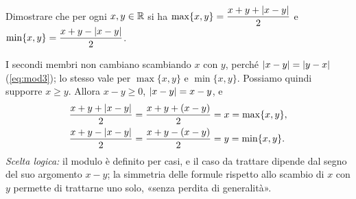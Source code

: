 \begin{esercizio}
Dimostrare che per ogni $x,y\in\mathbb{R}$ si ha $\max\{x,y\}=\dfrac{x+y+\lvert x-y\rvert}{2}$ e
$\min\{x,y\}=\dfrac{x+y-\lvert x-y\rvert}{2}$.
\begin{soluzione}
I secondi membri non cambiano scambiando $x$ con $y$, perché $\lvert x-y\rvert=\lvert y-x\rvert$
(\eqref{eq:mod3}); lo stesso vale per $\max\{x,y\}$ e $\min\{x,y\}$. Possiamo quindi
supporre $x\ge y$. Allora $x-y\ge0$, $\lvert x-y\rvert=x-y$, e
\[
\begin{aligned}
  \frac{x+y+\lvert x-y\rvert}{2}&=\frac{x+y+(x-y)}{2}=x=\max\{x,y\},\\
  \frac{x+y-\lvert x-y\rvert}{2}&=\frac{x+y-(x-y)}{2}=y=\min\{x,y\}.
\end{aligned}
\]
\emph{Scelta logica:} il modulo è definito per casi, e il caso da trattare dipende dal
segno del suo argomento $x-y$; la simmetria delle formule rispetto allo scambio di $x$
con $y$ permette di trattarne uno solo, «senza perdita di generalità».
\end{soluzione}
\end{esercizio}
